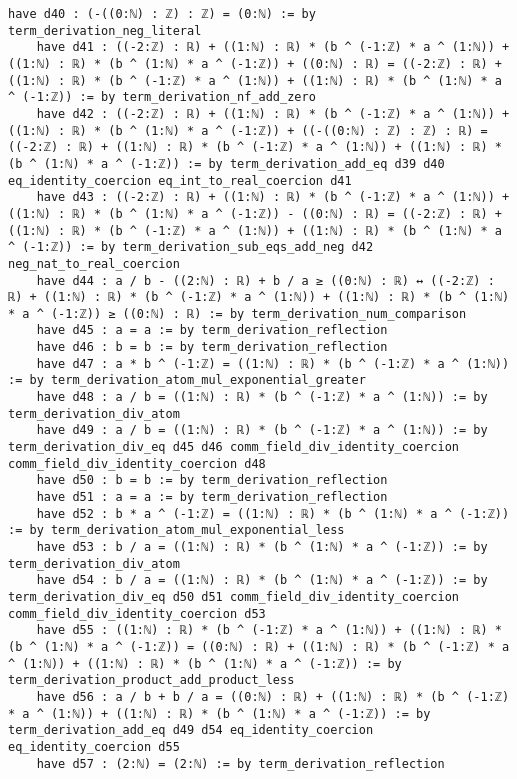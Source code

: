 \documentclass{article}
\begin{document}
\begin{tcolorbox}[colback=white!10, width=\linewidth]
\begin{lstlisting}[language=Lean4]
    have d40 : (-((0:ℕ) : ℤ) : ℤ) = (0:ℕ) := by term_derivation_neg_literal
    have d41 : ((-2:ℤ) : ℝ) + ((1:ℕ) : ℝ) * (b ^ (-1:ℤ) * a ^ (1:ℕ)) + ((1:ℕ) : ℝ) * (b ^ (1:ℕ) * a ^ (-1:ℤ)) + ((0:ℕ) : ℝ) = ((-2:ℤ) : ℝ) + ((1:ℕ) : ℝ) * (b ^ (-1:ℤ) * a ^ (1:ℕ)) + ((1:ℕ) : ℝ) * (b ^ (1:ℕ) * a ^ (-1:ℤ)) := by term_derivation_nf_add_zero
    have d42 : ((-2:ℤ) : ℝ) + ((1:ℕ) : ℝ) * (b ^ (-1:ℤ) * a ^ (1:ℕ)) + ((1:ℕ) : ℝ) * (b ^ (1:ℕ) * a ^ (-1:ℤ)) + ((-((0:ℕ) : ℤ) : ℤ) : ℝ) = ((-2:ℤ) : ℝ) + ((1:ℕ) : ℝ) * (b ^ (-1:ℤ) * a ^ (1:ℕ)) + ((1:ℕ) : ℝ) * (b ^ (1:ℕ) * a ^ (-1:ℤ)) := by term_derivation_add_eq d39 d40 eq_identity_coercion eq_int_to_real_coercion d41
    have d43 : ((-2:ℤ) : ℝ) + ((1:ℕ) : ℝ) * (b ^ (-1:ℤ) * a ^ (1:ℕ)) + ((1:ℕ) : ℝ) * (b ^ (1:ℕ) * a ^ (-1:ℤ)) - ((0:ℕ) : ℝ) = ((-2:ℤ) : ℝ) + ((1:ℕ) : ℝ) * (b ^ (-1:ℤ) * a ^ (1:ℕ)) + ((1:ℕ) : ℝ) * (b ^ (1:ℕ) * a ^ (-1:ℤ)) := by term_derivation_sub_eqs_add_neg d42 neg_nat_to_real_coercion
    have d44 : a / b - ((2:ℕ) : ℝ) + b / a ≥ ((0:ℕ) : ℝ) ↔ ((-2:ℤ) : ℝ) + ((1:ℕ) : ℝ) * (b ^ (-1:ℤ) * a ^ (1:ℕ)) + ((1:ℕ) : ℝ) * (b ^ (1:ℕ) * a ^ (-1:ℤ)) ≥ ((0:ℕ) : ℝ) := by term_derivation_num_comparison
    have d45 : a = a := by term_derivation_reflection
    have d46 : b = b := by term_derivation_reflection
    have d47 : a * b ^ (-1:ℤ) = ((1:ℕ) : ℝ) * (b ^ (-1:ℤ) * a ^ (1:ℕ)) := by term_derivation_atom_mul_exponential_greater
    have d48 : a / b = ((1:ℕ) : ℝ) * (b ^ (-1:ℤ) * a ^ (1:ℕ)) := by term_derivation_div_atom
    have d49 : a / b = ((1:ℕ) : ℝ) * (b ^ (-1:ℤ) * a ^ (1:ℕ)) := by term_derivation_div_eq d45 d46 comm_field_div_identity_coercion comm_field_div_identity_coercion d48
    have d50 : b = b := by term_derivation_reflection
    have d51 : a = a := by term_derivation_reflection
    have d52 : b * a ^ (-1:ℤ) = ((1:ℕ) : ℝ) * (b ^ (1:ℕ) * a ^ (-1:ℤ)) := by term_derivation_atom_mul_exponential_less
    have d53 : b / a = ((1:ℕ) : ℝ) * (b ^ (1:ℕ) * a ^ (-1:ℤ)) := by term_derivation_div_atom
    have d54 : b / a = ((1:ℕ) : ℝ) * (b ^ (1:ℕ) * a ^ (-1:ℤ)) := by term_derivation_div_eq d50 d51 comm_field_div_identity_coercion comm_field_div_identity_coercion d53
    have d55 : ((1:ℕ) : ℝ) * (b ^ (-1:ℤ) * a ^ (1:ℕ)) + ((1:ℕ) : ℝ) * (b ^ (1:ℕ) * a ^ (-1:ℤ)) = ((0:ℕ) : ℝ) + ((1:ℕ) : ℝ) * (b ^ (-1:ℤ) * a ^ (1:ℕ)) + ((1:ℕ) : ℝ) * (b ^ (1:ℕ) * a ^ (-1:ℤ)) := by term_derivation_product_add_product_less
    have d56 : a / b + b / a = ((0:ℕ) : ℝ) + ((1:ℕ) : ℝ) * (b ^ (-1:ℤ) * a ^ (1:ℕ)) + ((1:ℕ) : ℝ) * (b ^ (1:ℕ) * a ^ (-1:ℤ)) := by term_derivation_add_eq d49 d54 eq_identity_coercion eq_identity_coercion d55
    have d57 : (2:ℕ) = (2:ℕ) := by term_derivation_reflection

\end{lstlisting}
\end{tcolorbox}
\end{document}
